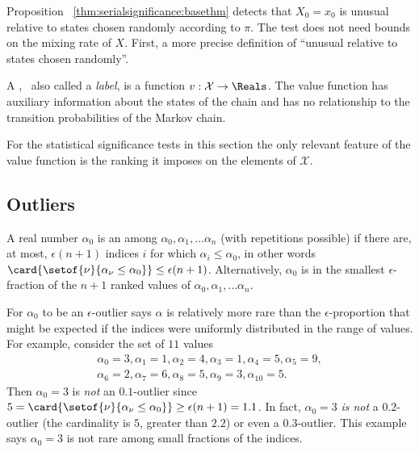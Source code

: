 \documentclass[12pt]{article}
\begin{document}
Proposition~%
\ref{thm:serialsignificance:basethm} detects that \( X_0 = x_0 \) is
unusual relative to states chosen randomly according to \( \pi \).  The
test does not need bounds on the mixing rate of \( X \).  First, a more
precise definition of ``unusual relative to states chosen randomly''.

\begin{definition}
    A ,~%
    also called a \emph{label}, is a function \( v :  \mathcal{X} \to
    \Reals \).  The value function has auxiliary information about the
    states of the chain and has no relationship to the transition
    probabilities of the Markov chain.
\end{definition}

\begin{remark}
    For the statistical significance tests in this section the only
    relevant feature of the value function is the ranking it imposes on
    the elements of \( \mathcal{X} \).
\end{remark}

\subsection*{Outliers}

\begin{definition}
    A real number \( \alpha_0 \) is an %
    among \( \alpha_0, \alpha_1, \dots \alpha_n \) (with repetitions
    possible) if there are, at most, \( \epsilon(n + 1) \) indices \( i \)
    for which \( \alpha_i \le \alpha_0 \), in other words \( \card{%
    \setof{\nu}{\alpha_{\nu} \le \alpha_0}} \le \epsilon(n+1) \).
    Alternatively, \( \alpha_0 \) is in the smallest \( \epsilon \)-fraction
    of the \( n + 1 \) ranked values of \( \alpha_0, \alpha_1, \dots
    \alpha_n \).
\end{definition}

\begin{remark}
    For \( \alpha_0 \) to be an \( \epsilon \)-outlier says \( \alpha \)
    is relatively more rare than the \( \epsilon \)-proportion that
    might be expected if the indices were uniformly distributed in the
    range of values.  For example, consider the set of \( 11 \) values
    \begin{multline*}
        \alpha_0 = 3, \alpha_1 = 1, \alpha_2 = 4, \alpha_3 = 1,
        \alpha_4 = 5, \alpha_5 = 9, \\
        \alpha_6 = 2, \alpha_7 = 6, \alpha_8 = 5, \alpha_9 = 3, \alpha_{10}
        = 5.
    \end{multline*}
    Then \( \alpha_0 = 3 \) is \emph{not} an \( 0.1 \)-outlier since \(
    5 = \card{%
    \setof{\nu}{\alpha_\nu \le \alpha_0}} \ge \epsilon(n+1) = 1.1 \).
    In fact, \( \alpha_0 = 3 \) \emph{is not} a \( 0.2 \)-outlier (the
    cardinality is \( 5 \), greater than \( 2.2 \)) or even a \( 0.3 \)-outlier.
    This example says \( \alpha_0 = 3 \) is not rare among small
    fractions of the indices.

\end{remark}
\end{document}
